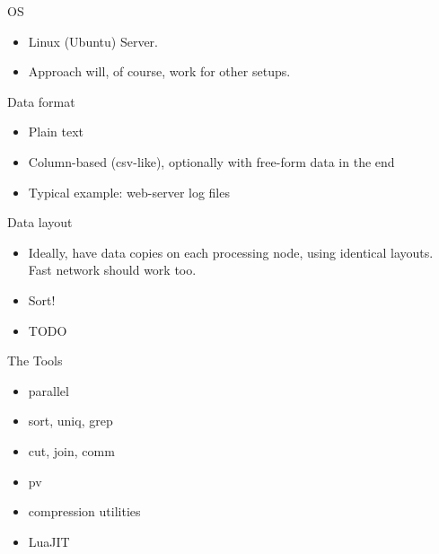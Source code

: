 \documentclass[handout]{beamer}
\begin{document}
\begin{frame}{OS}

\begin{itemize}
\item Linux (Ubuntu) Server.
\item Approach will, of course, work for other setups.
\end{itemize}

\end{frame}


\begin{frame}{Data format}

\begin{itemize}
\item Plain text
\item Column-based (csv-like), optionally with free-form data in the end
\item Typical example: web-server log files
\end{itemize}

\end{frame}


\begin{frame}{Data layout}

\begin{itemize}
\item Ideally, have data copies on each processing node, using identical
      layouts. Fast network should work too.
\item Sort!
\item TODO
\end{itemize}

\end{frame}


\begin{frame}{The Tools}

\begin{itemize}
\item parallel
\item sort, uniq, grep
\item cut, join, comm
\item pv
\item compression utilities
\item LuaJIT
\end{itemize}

\end{frame}
\end{document}
